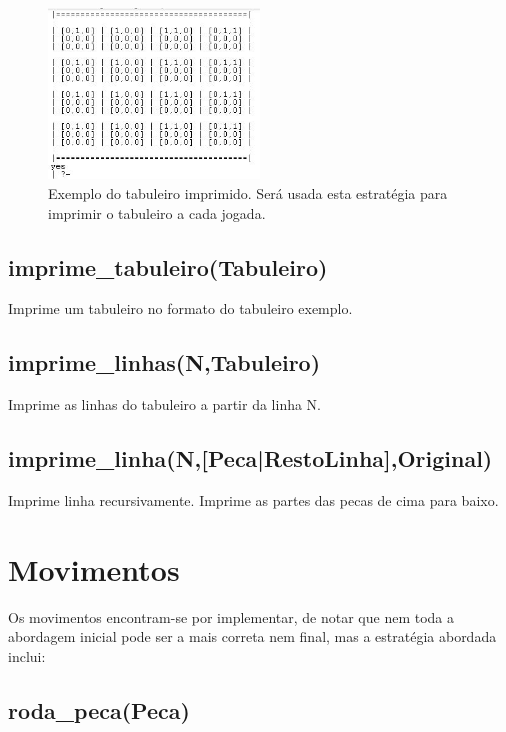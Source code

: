 \documentclass[a4paper]{article}
\begin{document}
\begin{figure}[h!]
  \centering
      \includegraphics[width=0.5\textwidth]{exemplot}
  \caption{Exemplo do tabuleiro imprimido. Será usada esta estratégia para imprimir o tabuleiro a cada jogada.}
\end{figure}

\subsection{imprime\_tabuleiro(Tabuleiro)}

Imprime um tabuleiro no formato do tabuleiro exemplo.

\subsection{imprime\_linhas(N,Tabuleiro)}

Imprime as linhas do tabuleiro a partir da linha N.

\subsection{imprime\_linha(N,[Peca|RestoLinha],Original)}

Imprime linha recursivamente. Imprime as partes das pecas de cima para baixo.

\section{Movimentos}

Os movimentos encontram-se por implementar, de notar que nem toda a abordagem inicial pode ser a mais correta nem final, mas a estratégia abordada inclui:


\subsection{roda\_peca(Peca)}
\end{document}
